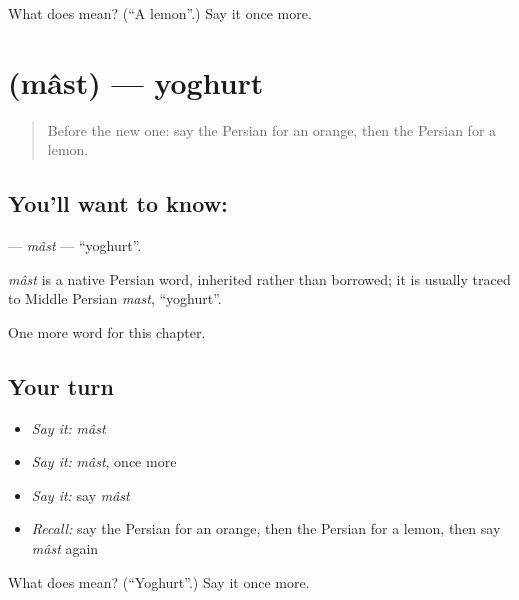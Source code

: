 \begin{tcolorbox}[breakable,colback=teal!4,colframe=teal!35!black,title={Before you move on}]
What does  mean? (\textquotedblleft{}A lemon\textquotedblright{}.) Say it once more.
\end{tcolorbox}
\section[\texorpdfstring{\fa{ماست} (mâst)}{ماست (mâst)}]{ (mâst) — yoghurt}

\label{lesson:FA-C43-mast}



\begin{quote}
Before the new one: say the Persian for an orange, then the Persian for a lemon.
\end{quote}

\subsection*{You'll want to know: }
\textbf{} — \emph{mâst} — \textquotedblleft{}yoghurt\textquotedblright{}.

\begin{cousinweb}
\emph{mâst} is a native Persian word, inherited rather than borrowed; it is usually traced to Middle Persian \emph{mast}, \textquotedblleft{}yoghurt\textquotedblright{}.
\end{cousinweb}

\begin{grammarlens}[title={What you've built}]
One more word for this chapter.
\end{grammarlens}

\subsection*{Your turn}
\begin{itemize}
\raggedright
  \item \emph{Say it:} \emph{mâst}
  \item \emph{Say it:} \emph{mâst}, once more
  \item \emph{Say it:} say \emph{mâst}
  \item \emph{Recall:} say the Persian for an orange, then the Persian for a lemon, then say \emph{mâst} again
\end{itemize}

\begin{tcolorbox}[breakable,colback=teal!4,colframe=teal!35!black,title={Before you move on}]
What does  mean? (\textquotedblleft{}Yoghurt\textquotedblright{}.) Say it once more.
\end{tcolorbox}
